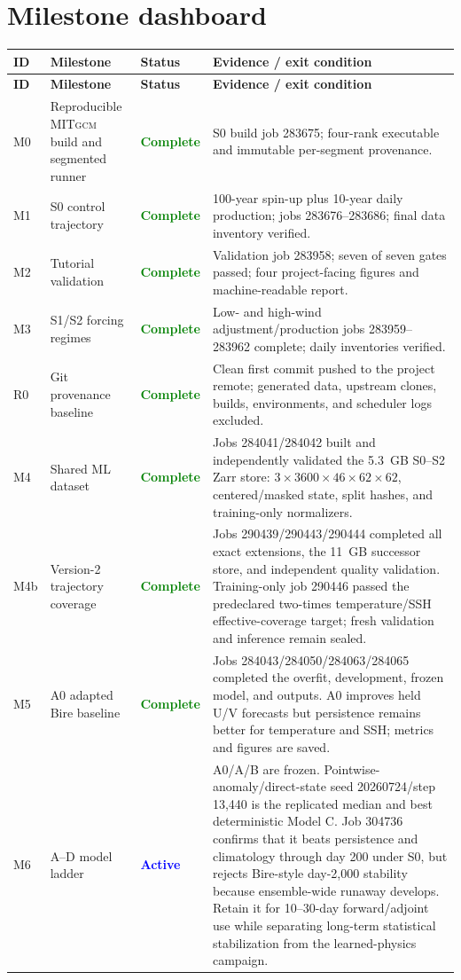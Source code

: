 \documentclass[11pt]{article}
\newcommand{\MITgcm}{\textsc{MITgcm}}
\newcommand{\Done}{\textcolor{green}{\textbf{Complete}}}
\newcommand{\Active}{\textcolor{blue}{\textbf{Active}}}
\begin{document}
\section{Milestone dashboard}

\begin{longtable}{@{}p{}p{}p{}p{}@{}}
\toprule
\textbf{ID} & \textbf{Milestone} & \textbf{Status} & \textbf{Evidence / exit condition} \\
\midrule
\endfirsthead
\toprule
\textbf{ID} & \textbf{Milestone} & \textbf{Status} & \textbf{Evidence / exit condition} \\
\midrule
\endhead
M0 & Reproducible \MITgcm{} build and segmented runner & \Done & S0 build job 283675; four-rank executable and immutable per-segment provenance. \\
M1 & S0 control trajectory & \Done & 100-year spin-up plus 10-year daily production; jobs 283676--283686; final data inventory verified. \\
M2 & Tutorial validation & \Done & Validation job 283958; seven of seven gates passed; four project-facing figures and machine-readable report. \\
M3 & S1/S2 forcing regimes & \Done & Low- and high-wind adjustment/production jobs 283959--283962 complete; daily inventories verified. \\
R0 & Git provenance baseline & \Done & Clean first commit pushed to the project remote; generated data, upstream clones, builds, environments, and scheduler logs excluded. \\
M4 & Shared ML dataset & \Done & Jobs 284041/284042 built and independently validated the 5.3~GB S0--S2 Zarr store: $3\times3600\times46\times62\times62$, centered/masked state, split hashes, and training-only normalizers. \\
M4b & Version-2 trajectory coverage & \Done & Jobs 290439/290443/290444 completed all exact extensions, the 11~GB successor store, and independent quality validation.  Training-only job 290446 passed the predeclared two-times temperature/SSH effective-coverage target; fresh validation and inference remain sealed. \\
M5 & A0 adapted Bire baseline & \Done & Jobs 284043/284050/284063/284065 completed the overfit, development, frozen model, and outputs.  A0 improves held U/V forecasts but persistence remains better for temperature and SSH; metrics and figures are saved. \\
M6 & A--D model ladder & \Active & A0/A/B are frozen.  Pointwise-anomaly/direct-state seed 20260724/step 13,440 is the replicated median and best deterministic Model C.  Job 304736 confirms that it beats persistence and climatology through day 200 under S0, but rejects Bire-style day-2,000 stability because ensemble-wide runaway develops.  Retain it for 10--30-day forward/adjoint use while separating long-term statistical stabilization from the learned-physics campaign. \\

\end{longtable}
\end{document}
